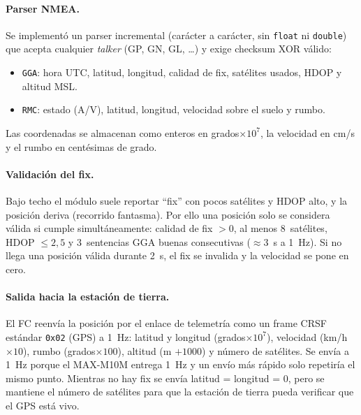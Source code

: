\documentclass[12pt, letterpaper]{report}
\begin{document}
\paragraph{Parser NMEA.} Se implementó un parser incremental (carácter a carácter, sin \texttt{float} ni \texttt{double}) que acepta cualquier \textit{talker} (GP, GN, GL, \ldots) y exige checksum XOR válido:
\begin{itemize}
    \item \texttt{GGA}: hora UTC, latitud, longitud, calidad de fix, satélites usados, HDOP y altitud MSL.
    \item \texttt{RMC}: estado (A/V), latitud, longitud, velocidad sobre el suelo y rumbo.
\end{itemize}
Las coordenadas se almacenan como enteros en grados$\times 10^{7}$, la velocidad en cm/s y el rumbo en centésimas de grado.

\paragraph{Validación del fix.} Bajo techo el módulo suele reportar ``fix'' con pocos satélites y HDOP alto, y la posición deriva (recorrido fantasma). Por ello una posición solo se considera válida si cumple simultáneamente: calidad de fix $>0$, al menos 8~satélites, HDOP $\le 2{,}5$ y 3~sentencias GGA buenas consecutivas ($\approx 3$~s a 1~Hz). Si no llega una posición válida durante 2~s, el fix se invalida y la velocidad se pone en cero.

\paragraph{Salida hacia la estación de tierra.} El FC reenvía la posición por el enlace de telemetría como un frame CRSF estándar \texttt{0x02} (GPS) a 1~Hz: latitud y longitud (grados$\times 10^{7}$), velocidad (km/h$\times 10$), rumbo (grados$\times 100$), altitud (m $+1000$) y número de satélites. Se envía a 1~Hz porque el MAX-M10M entrega 1~Hz y un envío más rápido solo repetiría el mismo punto. Mientras no hay fix se envía latitud = longitud = 0, pero se mantiene el número de satélites para que la estación de tierra pueda verificar que el GPS está vivo.
\end{document}
